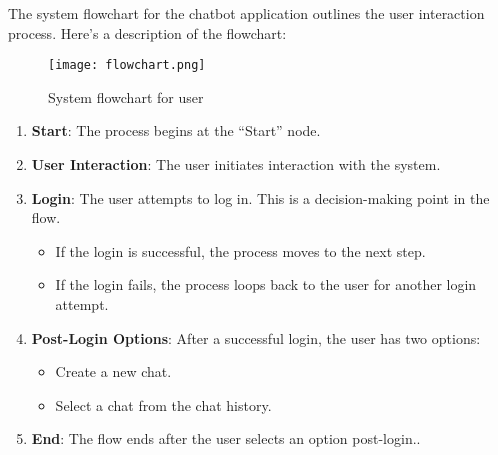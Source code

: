 The system flowchart for the chatbot application outlines the user interaction process. Here's a description of the flowchart:

\begin{figure}[h]
  \centering
  \texttt{[image: flowchart.png]}
  \caption{System flowchart for user}\label{fig:flowchart}
\end{figure}

\begin{enumerate}
  \item \textbf{Start}: The process begins at the “Start” node.
  \item \textbf{User Interaction}: The user initiates interaction with the system.
  \item \textbf{Login}: The user attempts to log in. This is a decision-making point in the flow.
  \begin{itemize}
    \item If the login is successful, the process moves to the next step.
    \item If the login fails, the process loops back to the user for another login attempt.
  \end{itemize}
  \item \textbf{Post-Login Options}: After a successful login, the user has two options:
  \begin{itemize}
    \item Create a new chat.
    \item Select a chat from the chat history.
  \end{itemize}
  \item \textbf{End}: The flow ends after the user selects an option post-login..
\end{enumerate}
